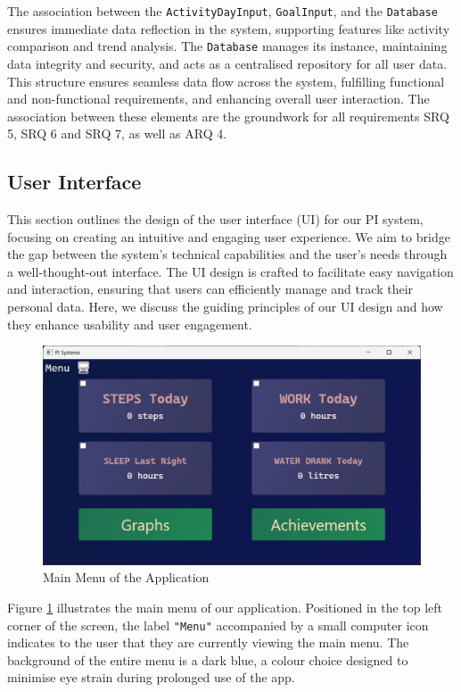 \documentclass[11pt]{article}
\begin{document}
The association between the \texttt{ActivityDayInput}, \texttt{GoalInput}, and the \texttt{Database}
ensures immediate data reflection in the system, supporting features like
activity comparison and trend analysis. The \texttt{Database} manages its instance,
maintaining data integrity and security, and acts as a centralised repository
for all user data. This structure ensures seamless data flow across the system,
fulfilling functional and non-functional requirements, and enhancing overall
user interaction. The association between these elements are the groundwork for all requirements SRQ 5, SRQ 6 and SRQ 7, as well as ARQ 4.\par

\newpage

\subsection{User Interface}

This section outlines the design of the user interface (UI) for our PI system,
focusing on creating an intuitive and engaging user experience. We aim to bridge
the gap between the system's technical capabilities and the user's needs through
a well-thought-out interface. The UI design is crafted to facilitate easy
navigation and interaction, ensuring that users can efficiently manage and track
their personal data. Here, we discuss the guiding principles of our UI design and
how they enhance usability and user engagement.\par

\begin{figure}[!ht]
  \centering
  \includegraphics[width = 0.5\linewidth]{Main Menu}
  \caption{Main Menu of the Application}
  \label{fig:Menu}
\end{figure}

Figure \ref{fig:Menu} illustrates the main menu of our application. Positioned in the top left
corner of the screen, the label \texttt{"Menu"} accompanied by a small computer icon indicates
to the user that they are currently viewing the main menu. The background of the 
entire menu is a dark blue, a colour choice designed to minimise eye strain during 
prolonged use of the app.\par
\end{document}

